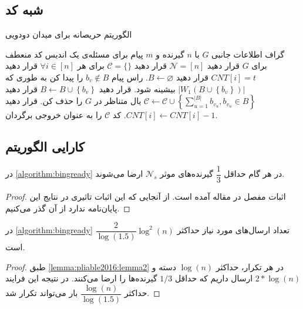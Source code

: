\subsection{شبه کد}
	\begin{algorithm}[H]
	\caption[
	الگوریتم حریصانه برای میدان دودویی
	]{
		الگوریتم حریصانه برای میدان دودویی
		\cite{pliable2016}
		}
	\label{algorithm:bingready}
	\begin{algorithmic}[1]
		\Require
		 گراف اطلاعات جانبی
		$G$
		با 
		$n$
		گیرنده و
		$m$
		پیام برای مسئله‌ی
		\Ensure
		یک اندیس کد منعطف برای
		$G$
		\State 
		قرار دهید
		 $\mathcal{N} = [n]$
		\State
		قرار دهید
		 $\mathcal{C} = \{\}$
		\State
		برای هر
		 $\forall i \in [n]$
		 قرار دهید
		 $CNT[i] = t$ 
		\State قرار دهید
		$B \leftarrow \varnothing$.
		\State
		راس پیام
		 $b_v \notin B$
		 را پیدا کن به طوری که
		 $\left|W_1\left(B \cup\left\{b_v\right\}\right)\right|$
		 بیشینه شود.
		\State قرار دهید
		$B \leftarrow B \cup\left\{b_v\right\}$
		\EndWhile
		\State قرار دهید
		 $\mathcal{C} \leftarrow \mathcal{C} \cup\left\{\sum_{u=1}^{|B|} b_{v_u}, b_{v_u} \in B\right\}$
		\State
		یال متناظر در
		 $G$
		 را حذف کن.
		\EndIf
		\State
		قرار دهید
		 $CNT[i] \leftarrow CNT[i]-1$.
		\EndFor
		\EndWhile
		\State کد
		 $\mathcal{C}$
		 را به عنوان خروجی برگردان.
	\end{algorithmic}
\end{algorithm}


\subsection{
کارایی الگوریتم
}
\begin{lemma}
	\label{lemma:pliable2016:lemma2}
	در 
	\autoref{algorithm:bingready}
	در هر گام حداقل 
	$\dfrac{1}{3}$
	گیرنده‌های موثر
	$\mathcal{N}_s$
	ارضا می‌شوند.
\end{lemma}
\begin{proof}
	اثبات مفصل در مقاله آمده است. از آنجایی که این اثبات تاثیری در نتایج این پایان‌نامه ندارد از آن گذر می‌کنیم.
\end{proof}

\begin{theorem}
	\label{theorem:pliable2016:theorem1}
	در 
		\autoref{algorithm:bingready}
		تعداد ارسال‌های مورد نیاز حداکثر
		$\dfrac{2}{\log(1.5)} \log^2(n)$
		است.
\end{theorem}
\begin{proof}
	 طبق
	 \autoref{lemma:pliable2016:lemma2}
	 در هر تکرار، حداکثر
	 $\log(n)$
	 دسته و
	 $2 * \log(n)$
	 ارسال داریم که حداقل
	 $1/3$
	 گیرنده‌ها را ارضا می‌کنند. در نتیجه این فرایند حداکثر
	 $\dfrac{\log(n)}{\log(1.5)}$
	 بار می‌تواند تکرار شد.
\end{proof}

